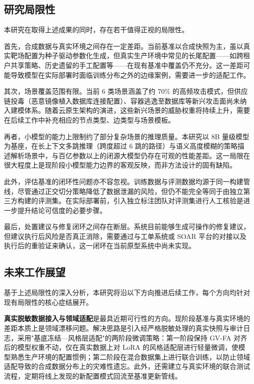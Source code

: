 \documentclass[a4paper,12pt]{ctexart}
\begin{document}
\subsection{研究局限性}

本研究在取得上述成果的同时，存在若干值得正视的局限性。

首先，合成数据与真实环境之间存在一定差距。当前基准以合成快照为主，虽以真实靶场配置为种子驱动参数化生成，但真实生产环境中常见的长尾配置——如跨租户共享策略、历史遗留的手工配置等——在现有基准中覆盖仍不充分。这一差距可能导致模型在实际部署时面临训练分布之外的边缘案例，需要进一步的适配工作。

其次，场景覆盖范围有限。当前 6 类场景涵盖了约 70\% 的高频攻击模式，但供应链投毒（恶意镜像植入数据库连接配置）、容器逃逸至数据库等新兴攻击面尚未纳入建模体系。随着云原生架构的演进，这些新兴场景的威胁权重将持续上升，需要在后续工作中补充相应的节点类型、边类型与场景模板。

再者，小模型的能力上限制约了部分复杂场景的推理质量。本研究以 8B 量级模型为基座，在长上下文多跳推理（跨度超过 6 跳的路径）与语义高度模糊的策略描述解析场景中，与百亿参数以上的闭源大模型仍存在可观的性能差距。这一局限在很大程度上是现阶段小模型能力边界的客观反映，而非方法设计的固有缺陷。

此外，评估基准的闭环性问题亦不容忽视。训练数据与评测数据均源于同一构建管线，尽管通过正交切分策略降低了数据泄漏的风险，但仍不能完全等同于由独立第三方构建的评测集。在实际部署前，引入独立标注团队对评测集进行人工核验是进一步提升结论可信度的必要步骤。

最后，处置建议与修复闭环之间存在断层。系统目前能够生成可操作的修复建议，但建议执行后风险是否真正消除，需要通过与工单系统或 SOAR 平台的对接以及执行后的重验证来确认，这一闭环在当前原型系统中尚未实现。

\subsection{未来工作展望}

基于上述局限性的深入分析，本研究将沿以下方向推进后续工作，每个方向均针对现有局限性的核心症结展开。

\textbf{真实脱敏数据接入与领域适配}是最具近期可行性的方向。现阶段基准与真实环境的差距本质上是领域漂移问题。解决思路是引入经严格脱敏处理的真实快照与审计日志，采用"基底冻结—风格层适配"的两阶段微调策略：第一阶段保持 GV-FA 对齐后的模型权重不动，仅在真实数据上对 LoRA 的风格适配层进行轻量微调，使模型熟悉生产环境的配置惯例；第二阶段在混合数据集上进行联合训练，以防止领域适配导致的合成数据分布上的灾难性遗忘。此外，还需建立与真实环境的联合测试流程，定期将线上发现的新配置模式回流至基准更新管线。
\end{document}

